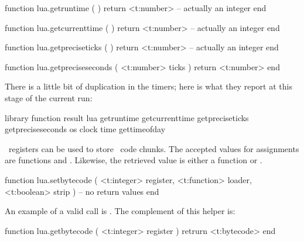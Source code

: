 \stopsubsection

\startsubsection[title=Timers]

\starttyping[option=LUA]
function lua.getruntime ( )
    return <t:number> -- actually an integer
end
\stoptyping

\starttyping[option=LUA]
function lua.getcurrenttime ( )
    return <t:number> -- actually an integer
end
\stoptyping

\starttyping[option=LUA]
function lua.getpreciseticks ( )
    return <t:number> -- actually an integer
end
\stoptyping

\starttyping[option=LUA]
function lua.getpreciseseconds ( <t:number> ticks )
    return <t:number>
end
\stoptyping

There is a little bit of duplication in the timers; here is what they report at
this stage of the current run:

\starttabulate[|lT|lT|l|]
    \FL
    \BC library \NC function              \BC result                               \NC \NR
    \TL
    \NC lua     \NC getruntime        \NC {}        \NC \NR
    \NC         \NC getcurrenttime    \NC {}    \NC \NR %
    \NC         \NC getpreciseticks   \NC {}   \NC \NR
    \NC         \NC getpreciseseconds \NC {} \NC \NR
    \ML
    \NC os      \NC clock             \NC {}              \NC \NR
    \NC         \NC time              \NC {}               \NC \NR
    \NC         \NC gettimeofday      \NC {}       \NC \NR
    \LL
\stoptabulate

\stopsubsection

\startsubsection[title=Bytecode registers]

\LUA\ registers can be used to store \LUA\ code chunks. The accepted values for
assignments are functions and . Likewise, the retrieved value is
either a function or .

\starttyping[option=LUA]
function lua.setbytecode (
    <t:integer>  register,
    <t:function> loader,
    <t:boolean>  strip
)
    -- no return values
end
\stoptyping

An example of a valid call is . The complement
of this helper is:

\starttyping[option=LUA]
function lua.getbytecode ( <t:integer> register )
    retrurn <t:bytecode>
end
\stoptyping

